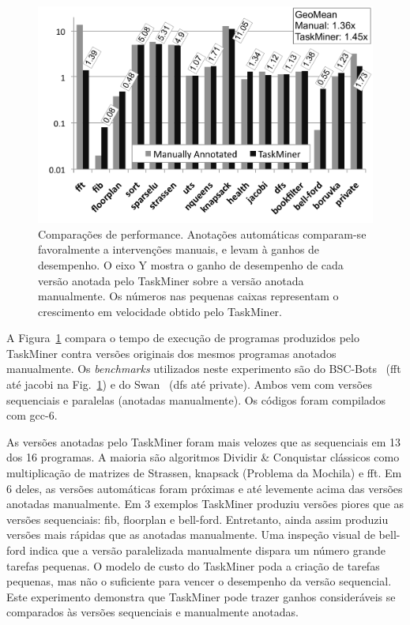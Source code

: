 \documentclass[sigplan,10pt,review]{acmart}
\newcommand\Taskminer{\mbox{\textsf{TaskMiner}}}
\begin{document}
\begin{figure}[b!]
\begin{center}
\includegraphics[width=1\columnwidth]{images/TM_Performance}
\caption{Comparações de performance. Anotações automáticas comparam-se favoralmente a intervenções
manuais, e levam à ganhos de desempenho. O eixo Y mostra o ganho de desempenho de cada versão anotada
pelo {\Taskminer} sobre a versão anotada manualmente. Os números nas pequenas caixas representam
o crescimento em velocidade obtido pelo {\Taskminer}.}
\label{fig:TM_Performance}
\end{center}
\end{figure}

A Figura~\ref{fig:TM_Performance} compara o tempo de execução de programas produzidos
pelo {\Taskminer} contra versões originais dos mesmos programas anotados manualmente.
Os {\em benchmarks} utilizados neste experimento são do \textsf{BSC-Bots}~\cite{Duran09} (\textsf{fft} até \textsf{jacobi}
na Fig.~\ref{fig:TM_Performance}) e do \textsf{Swan}~\cite{Moreira17}
(\textsf{dfs} até \textsf{private}).
Ambos vem com versões sequenciais e paralelas (anotadas manualmente). Os códigos foram compilados
com gcc-6.

As versões anotadas pelo \Taskminer{} foram mais velozes que as sequenciais em 13 dos 16 programas.
A maioria são algoritmos Dividir \& Conquistar clássicos como multiplicação de matrizes de \textsf{Strassen},
 \textsf{knapsack} (Problema da Mochila) e \textsf{fft}. Em 6 deles, as versões automáticas foram próximas e até
levemente acima das versões anotadas manualmente. Em 3 exemplos \Taskminer{} produziu versões piores que
as versões sequenciais: \textsf{fib}, \textsf{floorplan} e \textsf{bell-ford}. Entretanto, ainda assim produziu versões
mais rápidas que as anotadas manualmente. Uma inspeção visual de \textsf{bell-ford} indica que a versão
paralelizada manualmente dispara um número grande tarefas pequenas. O modelo de custo
do \Taskminer{} poda a criação de tarefas pequenas, mas não o suficiente para vencer o desempenho
da versão sequencial. Este experimento demonstra que \Taskminer{} pode trazer
ganhos consideráveis se comparados às versões sequenciais e manualmente anotadas.
\end{document}
